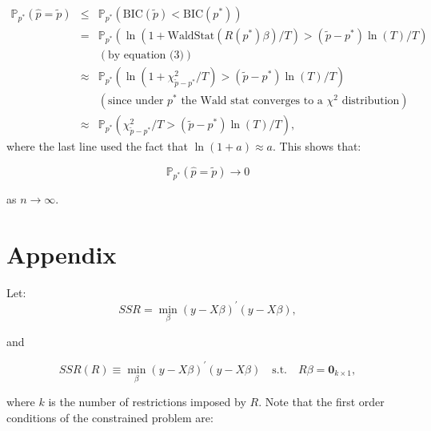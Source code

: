 \documentclass[12] {article}
\begin{document}
\begin{eqnarray*}
\mathbb{P}_{p^*}(\widehat{p} = \tilde{p}) &\leq& \mathbb{P}_{p^*}(\textrm{BIC}(\tilde{p}) < \textrm{BIC}(p^*)) \\
&=& \mathbb{P}_{p^*}(\ln (1+ \textrm{WaldStat} (R(p^*)\beta)/T)  > (\tilde{p}-p^*)\ln(T)/T) \\
&& (\textrm{by equation (3)}) \\
&\approx& \mathbb{P}_{p^*}(\ln (1+ \chi^2_{\tilde{p}-p^*}/T)  > (\tilde{p}-p^*)\ln(T)/T) \\
&& (\textrm{since under $p^*$ the Wald stat converges to a $\chi^2$ distribution}) \\
&\approx&  \mathbb{P}_{p^*}( \chi^2_{\tilde{p}-p^*}/T  > (\tilde{p}-p^*)\ln(T)/T),
\end{eqnarray*}
where the last line used the fact that $\ln(1+a) \approx a$. This shows that:

$$\mathbb{P}_{p^*}(\widehat{p} = \tilde{p})  \rightarrow 0 $$

\noindent as $n \rightarrow \infty$. 


\newpage


\newpage



\section{Appendix} 
Let:
\[ SSR = \min_{\beta} (y-X \beta)^{\prime} (y-X \beta), \]

\noindent and

\[ SSR(R) \equiv \min_{\beta} (y-X \beta)^{\prime} (y-X \beta) \quad \textrm{s.t.}\quad  R \beta = \textbf{0}_{k \times 1},  \]

\noindent where $k$ is the number of restrictions imposed by $R$. Note that the first order conditions of the constrained problem are:
\end{document}
